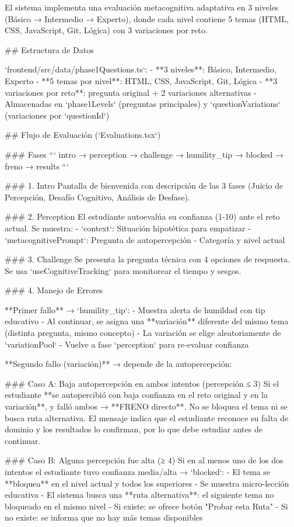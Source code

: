 El sistema implementa una evaluación metacognitiva adaptativa en 3 niveles (Básico → Intermedio → Experto), donde cada nivel contiene 5 temas (HTML, CSS, JavaScript, Git, Lógica) con 3 variaciones por reto.

## Estructura de Datos

`frontend/src/data/phase1Questions.ts`:
- **3 niveles**: Básico, Intermedio, Experto
- **5 temas por nivel**: HTML, CSS, JavaScript, Git, Lógica
- **3 variaciones por reto**: pregunta original + 2 variaciones alternativas
- Almacenadas en `phase1Levels` (preguntas principales) y `questionVariations` (variaciones por `questionId`)

## Flujo de Evaluación (`Evaluations.tsx`)

### Fases
```
intro → perception → challenge → humility_tip → blocked → freno → results
```

### 1. Intro
Pantalla de bienvenida con descripción de las 3 fases (Juicio de Percepción, Desafío Cognitivo, Análisis de Desfase).

### 2. Perception
El estudiante autoevalúa su confianza (1-10) ante el reto actual. Se muestra:
- `context`: Situación hipotética para empatizar
- `metacognitivePrompt`: Pregunta de autopercepción
- Categoría y nivel actual

### 3. Challenge
Se presenta la pregunta técnica con 4 opciones de respuesta. Se usa `useCognitiveTracking` para monitorear el tiempo y sesgos.

### 4. Manejo de Errores

**Primer fallo** → `humility_tip`:
- Muestra alerta de humildad con tip educativo
- Al continuar, se asigna una **variación** diferente del mismo tema (distinta pregunta, mismo concepto)
- La variación se elige aleatoriamente de `variationPool`
- Vuelve a fase `perception` para re-evaluar confianza

**Segundo fallo (variación)** → depende de la autopercepción:

### Caso A: Baja autopercepción en ambos intentos (percepción ≤ 3)
Si el estudiante **se autopercibió con baja confianza en el reto original y en la variación**, y falló ambos → **FRENO directo**. No se bloquea el tema ni se busca ruta alternativa. El mensaje indica que el estudiante reconoce su falta de dominio y los resultados lo confirman, por lo que debe estudiar antes de continuar.

### Caso B: Alguna percepción fue alta (≥ 4)
Si en al menos uno de los dos intentos el estudiante tuvo confianza media/alta → `blocked`:
- El tema se **bloquea** en el nivel actual y todos los superiores
- Se muestra micro-lección educativa
- El sistema busca una **ruta alternativa**: el siguiente tema no bloqueado en el mismo nivel
- Si existe: se ofrece botón "Probar esta Ruta"
- Si no existe: se informa que no hay más temas disponibles

